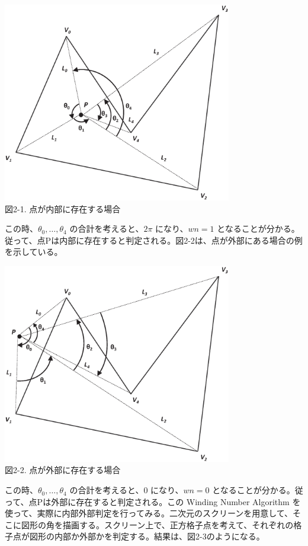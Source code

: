 \begin{center}
  \includegraphics[width=10cm]{wn_inside.eps} \\
 \vspace{1mm}
  図2-1. 点が内部に存在する場合
\end{center}

この時、$\theta_0, \ldots, \theta_4$ の合計を考えると、$2\pi$ になり、$wn = 1$ となることが分かる。従って、点Pは内部に存在すると判定される。図2-2は、点が外部にある場合の例を示している。

\begin{center}
  \includegraphics[width=10cm]{wn_outside.eps} \\
 \vspace{1mm}
  図2-2. 点が外部に存在する場合
\end{center}

この時、$\theta_0, \ldots, \theta_4$ の合計を考えると、$0$ になり、$wn = 0$ となることが分かる。従って、点Pは外部に存在すると判定される。この Winding Number Algorithm を使って、実際に内部外部判定を行ってみる。二次元のスクリーンを用意して、そこに図形の角を描画する。スクリーン上で、正方格子点を考えて、それぞれの格子点が図形の内部か外部かを判定する。結果は、図2-3のようになる。

